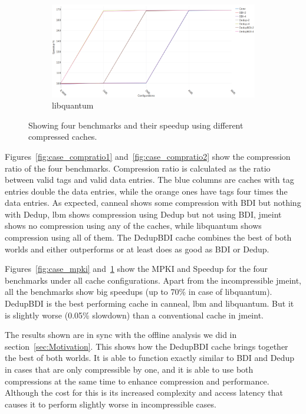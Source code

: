 \begin{figure}
\begin{subfigure}{0.5\textwidth}
        \includegraphics[width=\textwidth]{libquantum-speedup.png}
        \caption{libquantum}
    \end{subfigure}
    \caption[Case Study: Speedup]{Showing four benchmarks and their speedup using different compressed caches.}
    \label{fig:case_speedup}
\end{figure}
Figures~\ref{fig:case_compratio1} and~\ref{fig:case_compratio2} show the compression ratio of the four benchmarks. Compression ratio is calculated as the ratio between valid tags and valid data entries. The blue columns are caches with tag entries double the data entries, while the orange ones have tags four times the data entries. As expected, canneal shows some compression with BDI but nothing with Dedup, lbm shows compression using Dedup but not using BDI, jmeint shows no compression using any of the caches, while libquantum shows compression using all of them. The DedupBDI cache combines the best of both worlds and either outperforms or at least does as good as BDI or Dedup.\par
Figures~\ref{fig:case_mpki} and~\ref{fig:case_speedup} show the MPKI and Speedup for the four benchmarks under all cache configurations. Apart from the incompressible jmeint, all the benchmarks show big speedups (up to 70\% in case of libquantum). DedupBDI is the best performing cache in canneal, lbm and libquantum. But it is slightly worse (0.05\% slowdown) than a conventional cache in jmeint.\par
The results shown are in sync with the offline analysis we did in section~\ref{sec:Motivation}. This shows how the DedupBDI cache brings together the best of both worlds. It is able to function exactly similar to BDI and Dedup in cases that are only compressible by one, and it is able to use both compressions at the same time to enhance compression and performance. Although the cost for this is its increased complexity and access latency that causes it to perform slightly worse in incompressible cases.

